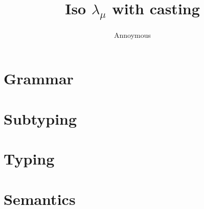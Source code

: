 \documentclass[a4paper]{article}
\title{Iso $\mathsf{\lambda}_{\mu}$ with casting}
\author{Annoymous}
\begin{document}
\maketitle



\section{Grammar}

\ottgrammar

\section{Subtyping}

\ottdefnsWellFormedTypeEnv


\section{Typing}

\ottdefnsWellFormedTermEnv

\ottdefnsWellFormedType

\ottdefnsTypCast

\ottdefnsTyping



\section{Semantics}

\ottdefnsValues


\ottdefnsReduction
\end{document}
